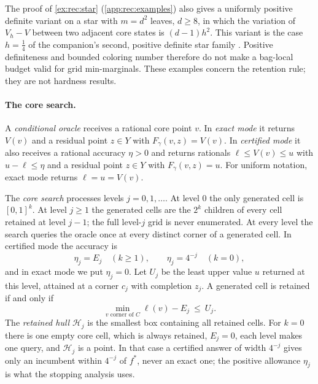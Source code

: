 The proof of \cref{ex:rec:star} (\cref{app:rec:examples}) also gives a uniformly positive definite
variant on a star with $m=d^2$ leaves, $d\ge8$, in which the variation of
$V_h-V$ between two adjacent core states is $(d-1)h^2$. This variant is the
case $h=\frac14$ of the companion's second, positive definite star family
\citep{companion-decomposition-aware}. Positive
definiteness and bounded coloring number therefore do not make a bag-local
budget valid for grid min-marginals. These examples concern the retention
rule; they are not hardness results.

\paragraph{The core search.}
A \emph{conditional oracle} receives a rational core point $v$. In
\emph{exact mode} it returns $V(v)$ and a residual point $z\in Y$ with
$F_\gamma(v,z)=V(v)$. In \emph{certified mode} it also receives a rational
accuracy $\eta>0$ and returns rationals $\ell\le V(v)\le u$ with
$u-\ell\le\eta$ and a residual point $z\in Y$ with $F_\gamma(v,z)=u$. For
uniform notation, exact mode returns $\ell=u=V(v)$.

The \emph{core search} processes levels $j=0,1,\ldots$. At level $0$ the
only generated cell is $[0,1]^k$. At level $j\ge1$ the generated cells are
the $2^k$ children of every cell retained at level $j-1$; the full level-$j$
grid is never enumerated. At every level the search queries the oracle once
at every distinct corner of a generated cell. In certified mode the
accuracy is
\begin{equation}\label{eq:rec:eta}
 \eta_j=E_j\quad(k\ge1),\qquad \eta_j=4^{-j}\quad(k=0),
\end{equation}
and in exact mode we put $\eta_j=0$. Let $U_j$ be the least upper value $u$
returned at this level, attained at a corner $c_j$ with completion $z_j$. A
generated cell is retained if and only if
\begin{equation}\label{eq:rec:retain}
 \min_{v\text{ corner of }C}\ell(v)-E_j\ \le\ U_j .
\end{equation}
The \emph{retained hull} $\mathcal H_j$ is the smallest box containing all
retained cells. For $k=0$ there is one empty core cell, which is always
retained, $E_j=0$, each level makes one query, and $\mathcal H_j$ is a point.
In that case a certified answer of width $4^{-j}$ gives only an incumbent
within $4^{-j}$ of $f^*$, never an exact one; the positive allowance
$\eta_j$ is what the stopping analysis uses.

